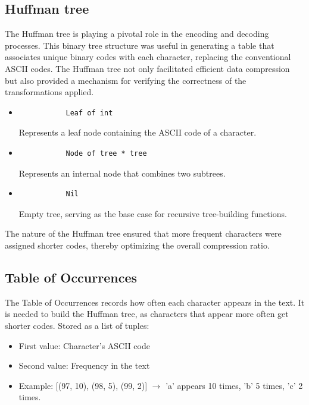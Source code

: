 \documentclass[12pt,oneside,letterpaper,english]{article}
\begin{document}
\subsection*{Huffman tree}
The Huffman tree is playing a pivotal role in the encoding and decoding processes. This binary tree structure was useful in generating a table that associates unique binary codes with each character, replacing the conventional ASCII codes. The Huffman tree not only facilitated efficient data compression but also provided a mechanism for verifying the correctness of the transformations applied.

\begin{itemize}
    \item 
        \begin{verbatim}
           Leaf of int 
        \end{verbatim}
        Represents a leaf node containing the ASCII code of a character.
    \item 
        \begin{verbatim}
           Node of tree * tree 
        \end{verbatim}
        Represents an internal node that combines two subtrees.
    \item 
        \begin{verbatim}
           Nil 
        \end{verbatim}
        Empty tree, serving as the base case for recursive tree-building functions.
\end{itemize}
The nature of the Huffman tree ensured that more frequent characters were assigned shorter codes, thereby optimizing the overall compression ratio.

\subsection*{Table of Occurrences}
The Table of Occurrences records how often each character appears in the text. It is needed to build the Huffman tree, as characters that appear more often get shorter codes.
Stored as a list of tuples:
\begin{itemize}
    \item 
        First value: Character's ASCII code
    \item
        Second value: Frequency in the text
    \item
        Example: [(97, 10), (98, 5), (99, 2)] $\rightarrow$ 'a' appears 10 times, 'b' 5 times, 'c' 2 times.
\end{itemize}
\end{document}
